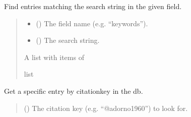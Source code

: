 \documentclass[letterpaper,10pt,english]{sphinxmanual}
\begin{document}
\begin{fulllineitems}
\begin{fulllineitems}
\end{fulllineitems}


\begin{fulllineitems}
\label{\detokenize{generated/bp_text.database:bp_text.database.BibTexDatabase.find_entries}}
\pysigstartsignatures
\pysiglinewithargsret
{}
{\sphinxparamcomma {}}
{}
\pysigstopsignatures
\sphinxAtStartPar
Find entries matching the search string in the given field.
\begin{quote}\begin{description}
\begin{itemize}
\item {} 
\sphinxAtStartPar
{} () \textendash{} The field name (e.g. “keywords”).

\item {} 
\sphinxAtStartPar
{} () \textendash{} The search string.

\end{itemize}

\sphinxAtStartPar
A list with items of 

\sphinxAtStartPar
list

\end{description}\end{quote}

\end{fulllineitems}


\begin{fulllineitems}
\label{\detokenize{generated/bp_text.database:bp_text.database.BibTexDatabase.get_entry_by_key}}
\pysigstartsignatures
\pysiglinewithargsret
{}
{}
{}
\pysigstopsignatures
\sphinxAtStartPar
Get a specific entry by citation\sphinxhyphen{}key in the db.
\begin{quote}\begin{description}
\sphinxAtStartPar
{} () \textendash{} The citation key (e.g. “@adorno1960”) to look for.


\end{description}
\end{quote}
\end{fulllineitems}
\end{fulllineitems}
\end{document}
